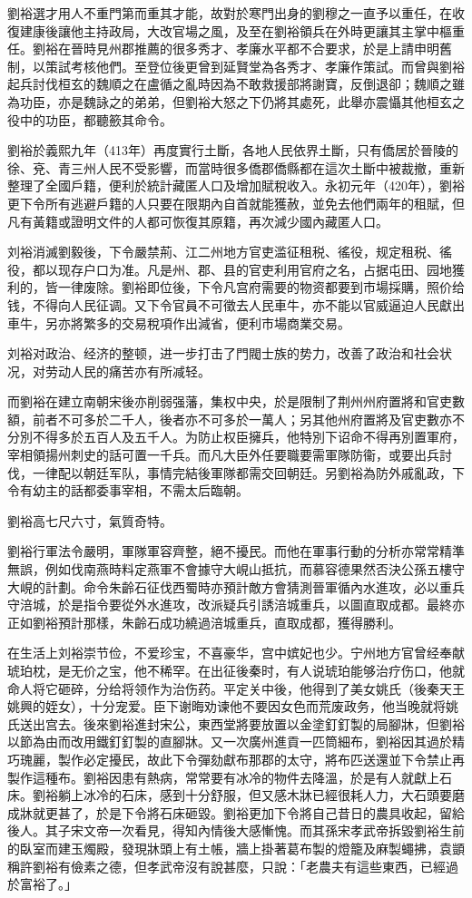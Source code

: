 劉裕選才用人不重門第而重其才能，故對於寒門出身的劉穆之一直予以重任，在收復建康後讓他主持政局，大改官場之風，及至在劉裕領兵在外時更讓其主掌中樞重任。劉裕在晉時見州郡推薦的很多秀才、孝廉水平都不合要求，於是上請申明舊制，以策試考核他們。至登位後更曾到延賢堂為各秀才、孝廉作策試。而曾與劉裕起兵討伐桓玄的魏順之在盧循之亂時因為不敢救援部將謝寶，反倒退卻；魏順之雖為功臣，亦是魏詠之的弟弟，但劉裕大怒之下仍將其處死，此舉亦震懾其他桓玄之役中的功臣，都聽籨其命令。

劉裕於義熙九年（413年）再度實行土斷，各地人民依界土斷，只有僑居於晉陵的徐、兗、青三州人民不受影響，而當時很多僑郡僑縣都在這次土斷中被裁撤，重新整理了全國戶籍，便利於統計藏匿人口及增加賦稅收入。永初元年（420年），劉裕更下令所有逃避戶籍的人只要在限期內自首就能獲赦，並免去他們兩年的租賦，但凡有黃籍或證明文件的人都可恢復其原籍，再次減少國內藏匿人口。

刘裕消滅劉毅後，下令嚴禁荊、江二州地方官吏滥征租税、徭役，规定租税、徭役，都以现存户口为准。凡是州、郡、县的官吏利用官府之名，占据屯田、园地獲利的，皆一律废除。劉裕即位後，下令凡宫府需要的物资都要到市場採購，照价给钱，不得向人民征调。又下令官員不可徵去人民車牛，亦不能以官威逼迫人民獻出車牛，另亦將繁多的交易稅項作出減省，便利市場商業交易。

刘裕对政治、经济的整顿，进一步打击了門閥士族的势力，改善了政治和社会状况，对劳动人民的痛苦亦有所减轻。

而劉裕在建立南朝宋後亦削弱强藩，集权中央，於是限制了荆州州府置將和官吏數額，前者不可多於二千人，後者亦不可多於一萬人；另其他州府置將及官吏數亦不分別不得多於五百人及五千人。为防止权臣擁兵，他特別下诏命不得再別置軍府，宰相領揚州刺史的話可置一千兵。而凡大臣外任要職要需軍隊防衞，或要出兵討伐，一律配以朝廷军队，事情完結後軍隊都需交回朝廷。另劉裕為防外戚亂政，下令有幼主的話都委事宰相，不需太后臨朝。

劉裕高七尺六寸，氣質奇特。

劉裕行軍法令嚴明，軍隊軍容齊整，絕不擾民。而他在軍事行動的分析亦常常精準無誤，例如伐南燕時料定燕軍不會據守大峴山抵抗，而慕容德果然否決公孫五樓守大峴的計劃。命令朱齡石征伐西蜀時亦預計敵方會猜測晉軍循內水進攻，必以重兵守涪城，於是指令要從外水進攻，改派疑兵引誘涪城重兵，以圖直取成都。最終亦正如劉裕預計那樣，朱齡石成功繞過涪城重兵，直取成都，獲得勝利。

在生活上刘裕崇节俭，不爱珍宝，不喜豪华，宫中嫔妃也少。宁州地方官曾经奉献琥珀枕，是无价之宝，他不稀罕。在出征後秦时，有人说琥珀能够治疗伤口，他就命人将它砸碎，分给将领作为治伤药。平定关中後，他得到了美女姚氏（後秦天王姚興的姪女），十分宠爱。臣下谢晦劝谏他不要因女色而荒废政务，他当晚就将姚氏送出宫去。後來劉裕進封宋公，東西堂將要放置以金塗釘釘製的局腳牀，但劉裕以節為由而改用鐵釘釘製的直腳牀。又一次廣州進貢一匹筒細布，劉裕因其過於精巧瑰麗，製作必定擾民，故此下令彈劾獻布那郡的太守，將布匹送還並下令禁止再製作這種布。劉裕因患有熱病，常常要有冰冷的物件去降溫，於是有人就獻上石床。劉裕躺上冰冷的石床，感到十分舒服，但又感木牀已經很耗人力，大石頭要磨成牀就更甚了，於是下令將石床砸毀。劉裕更加下令將自己昔日的農具收起，留給後人。其子宋文帝一次看見，得知內情後大感慚愧。而其孫宋孝武帝拆毀劉裕生前的臥室而建玉燭殿，發現牀頭上有土帳，牆上掛著葛布製的燈籠及麻製蠅拂，袁顗稱許劉裕有儉素之德，但孝武帝沒有說甚麼，只說：「老農夫有這些東西，已經過於富裕了。」

